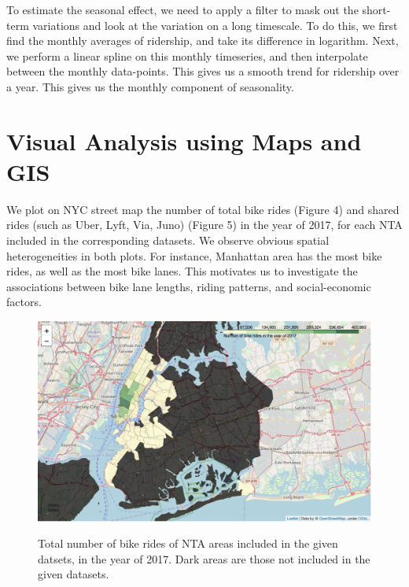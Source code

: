 \documentclass[12pt]{article}
\begin{document}
To estimate the seasonal effect, we need to apply a filter to mask out the short-term variations and look at the variation on a long timescale. To do this, we first find the monthly averages of ridership, and take its difference in logarithm. Next, we perform a linear spline on this monthly timeseries, and then interpolate between the monthly data-points. This gives us a smooth trend for ridership over a year. This gives us the monthly component of seasonality.

\section*{Visual Analysis using Maps and GIS}

We plot on NYC street map the number of total bike rides (Figure 4)  and shared rides (such as Uber, Lyft, Via, Juno) (Figure 5) in the year of 2017, for each NTA included in the corresponding datasets. We observe obvious spatial heterogeneities in both plots. For instance, Manhattan area has the most bike rides, as well as the most bike lanes. This motivates us to investigate the associations between bike lane lengths, riding patterns, and social-economic factors.


\begin{figure}[htbp]
    \includegraphics[scale=0.3]{Number_bike_rides_2017.png} \label{fig:bike}
    \caption{Total number of bike rides of NTA areas included in the given datsets, in the year of 2017. Dark areas are those not included in the given datasets.}
\end{figure}
\end{document}
